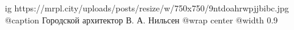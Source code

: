  
 
 
 
 

\ifcmt
  ig https://mrpl.city/uploads/posts/resize/w/750x750/9ntdoahrwpjjbibc.jpg
	@caption Городской архитектор В. А. Нильсен
  @wrap center
  @width 0.9
\fi
